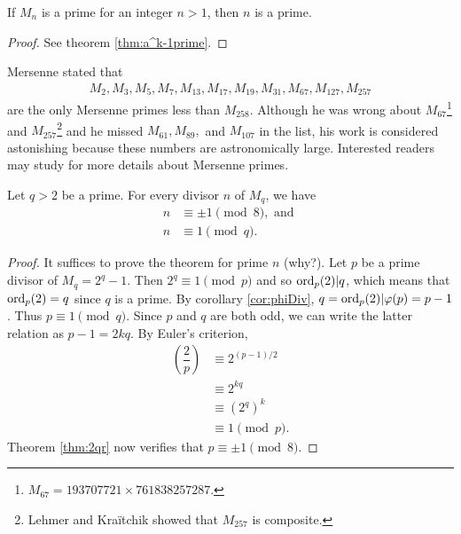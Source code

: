 \documentclass{subfiles}
\begin{document}
		\begin{proposition}
			If $M_n$ is a prime for an integer $n>1$, then $n$ is a prime.
		\end{proposition}

		\begin{proof}
			See theorem \autoref{thm:a^k-1prime}.
		\end{proof}

	Mersenne stated that
		\begin{align*}
				M_{2}, M_{3}, M_{5}, M_{7}, M_{13},M_{17},M_{19},M_{31},M_{67},M_{127},M_{257}
		\end{align*}
	are the only Mersenne primes less than $M_{258}$. Although he was wrong about $M_{67}$\footnote{$M_{67}=193707721 \times 761838257287.$} and $M_{257}$\footnote{Lehmer and Kra\"{i}tchik showed that $M_{257}$ is composite.} and he missed $M_{61}, M_{89},$ and $M_{107}$ in the list, his work is considered astonishing because these numbers are astronomically large. Interested readers may study \textcite{ribenboim_1991} for more details about Mersenne primes.

		\begin{theorem}
				Let $q>2$ be a prime. For every divisor $n$ of $M_q$, we have
					\begin{align*}
						n &\equiv \pm 1 \pmod 8, \text{ and }\\
						n &\equiv 1 \pmod q.
					\end{align*}
		\end{theorem}

		\begin{proof}
			It suffices to prove the theorem for prime $n$ (why?). Let $p$ be a prime divisor of $M_q=2^q-1$. Then $2^q \equiv 1 \pmod p$ and so $\operatorname{ord}_p(2)|q$, which means that $\operatorname{ord}_p(2)=q$ since $q$ is a prime. By corollary \eqref{cor:phiDiv}, $q=\operatorname{ord}_p(2)|\varphi(p)=p-1$. Thus $p \equiv 1 \pmod q$. Since $p$ and $q$ are both odd, we can write the latter relation as $p-1=2kq$. By Euler's criterion,
				\begin{align*}
					\left(\dfrac{2}{p}\right) &\equiv 2^{(p-1)/2} \\
											  &\equiv 2^{kq}\\
											  &\equiv \left(2^q\right)^k\\
											  &\equiv 1 \pmod p.
				\end{align*}
			Theorem \autoref{thm:2qr} now verifies that $p \equiv \pm 1 \pmod 8$.
		\end{proof}
\end{document}
